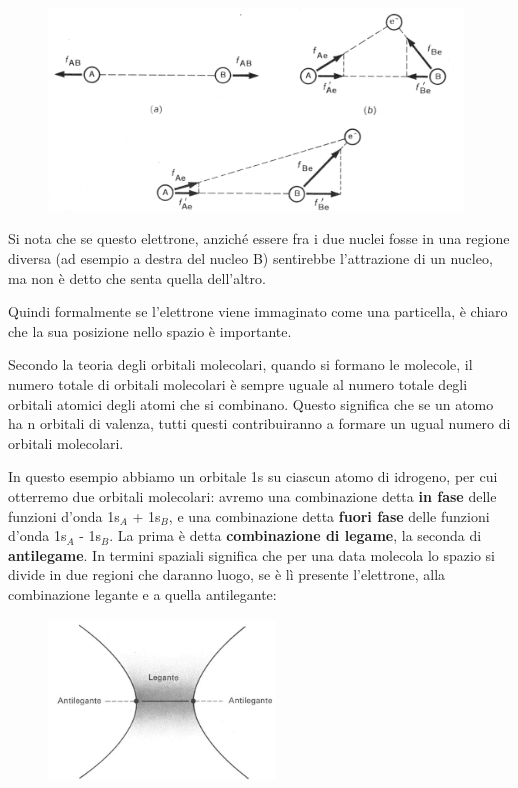 \begin{figure}[htp]
    \centering
    \includegraphics[width=11cm]{immagini/posizone_elettrone.png}
\end{figure}

Si nota che se questo elettrone, anziché essere fra i due nuclei fosse in una regione diversa (ad esempio a destra del nucleo B) sentirebbe l'attrazione di un nucleo, ma non è detto che senta quella dell'altro.

Quindi formalmente se l'elettrone viene immaginato come una particella, è chiaro che la sua posizione nello spazio è importante.

Secondo la teoria degli orbitali molecolari, quando si formano le molecole, il numero totale di orbitali molecolari è sempre uguale al numero totale degli orbitali atomici degli atomi che si combinano. Questo significa che se un atomo ha n orbitali di valenza, tutti questi contribuiranno a formare un ugual numero di orbitali molecolari.

In questo esempio abbiamo un orbitale 1s su ciascun atomo di idrogeno, per cui otterremo due orbitali molecolari: avremo una combinazione detta \textbf{in fase} delle funzioni d'onda 1s$_A$ + 1s$_B$, e una combinazione detta \textbf{fuori fase} delle funzioni d'onda 1s$_A$ - 1s$_B$. La prima è detta \textbf{combinazione di legame}, la seconda di \textbf{antilegame}. In termini spaziali significa che per una data molecola lo spazio si divide in due regioni che daranno luogo, se è lì presente l'elettrone, alla combinazione legante e a quella antilegante:

\begin{figure}[htp]
    \centering
    \includegraphics[width=6cm]{immagini/spazio_legante_antilegante.png}
\end{figure}

